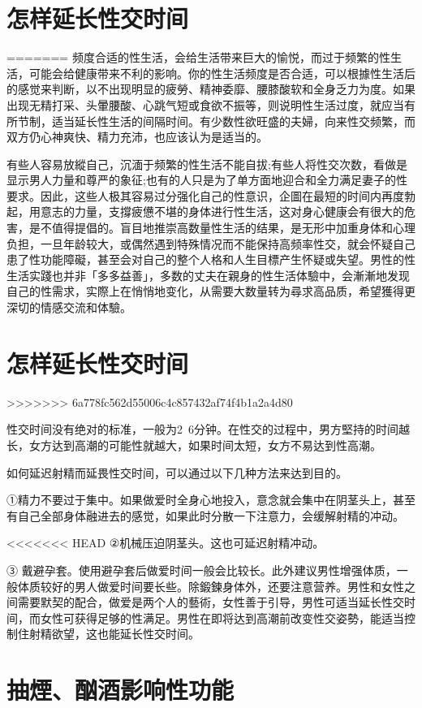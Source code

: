 \documentclass[12pt,UTF8]{ctexbook}
\begin{document}
\section{怎样延长性交时间}
=======
频度合适的性生活，会给生活带来巨大的愉悦，而过于频繁的性生活，可能会给健康带来不利的影响。你的性生活频度是否合适，可以根據性生活后的感觉来判断，以不出现明显的疲勞、精神委靡、腰膝酸软和全身乏力为度。如果出现无精打采、头暈腰酸、心跳气短或食欲不振等，则说明性生活过度，就应当有所节制，适当延长性生活的间隔时间。有少数性欲旺盛的夫婦，向来性交频繁，而双方仍心神爽快、精力充沛，也应该认为是适当的。

有些人容易放縱自己，沉湎于频繁的性生活不能自拔;有些人将性交次数，看做是显示男人力量和尊严的象征;也有的人只是为了单方面地迎合和全力满足妻子的性要求。因此，这些人极其容易过分强化自己的性意识，企圖在最短的时间内再度勃起，用意志的力量，支撐疲憊不堪的身体进行性生活，这对身心健康会有很大的危害，是不值得提倡的。盲目地推崇高数量性生活的结果，是无形中加重身体和心理负担，一旦年龄较大，或偶然遇到特殊情况而不能保持高频率性交，就会怀疑自己患了性功能障礙，甚至会对自己的整个人格和人生目標产生怀疑或失望。男性的性生活实踐也并非「多多益善」，多数的丈夫在親身的性生活体驗中，会漸漸地发现自己的性需求，实際上在悄悄地变化，从需要大数量转为尋求高品质，希望獲得更深切的情感交流和体驗。

\section{怎样延长性交时间}
>>>>>>> 6a778fc562d55006c4c857432af74f4b1a2a4d80

性交时间没有绝对的标准，一般为2~6分钟。在性交的过程中，男方堅持的时间越长，女方达到高潮的可能性就越大，如果时间太短，女方不易达到性高潮。

如何延迟射精而延畏性交时间，可以通过以下几种方法来达到目的。

①精力不要过于集中。如果做爱时全身心地投入，意念就会集中在阴茎头上，甚至有自己全部身体融进去的感觉，如果此时分散一下注意力，会缓解射精的冲动。

<<<<<<< HEAD
②机械压迫阴茎头。这也可延迟射精冲动。

③ 戴避孕套。使用避孕套后做爱时间一般会比较长。此外建议男性增强体质，一般体质较好的男人做爱时间要长些。除鍛鍊身体外，还要注意营养。男性和女性之间需要默契的配合，做爱是两个人的藝術，女性善于引导，男性可适当延长性交时间，而女性可获得足够的性满足。男性在即将达到高潮前改变性交姿勢，能适当控制住射精欲望，这也能延长性交时间。

\section{抽煙、酗酒影响性功能}
\end{document}
